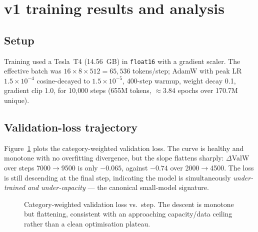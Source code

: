 \documentclass[10pt,twocolumn]{article}
\begin{document}
\section{v1 training results and analysis}
\label{sec:results}

\subsection{Setup}
Training used a Tesla~T4 (14.56~GB) in \texttt{float16} with a gradient scaler.
The effective batch was $16\times8\times512 = 65{,}536$ tokens/step; AdamW with
peak LR $1.5\!\times\!10^{-4}$ cosine-decayed to $1.5\!\times\!10^{-5}$,
400-step warmup, weight decay 0.1, gradient clip 1.0, for 10{,}000 steps
(655M tokens, $\approx$3.84 epochs over 170.7M unique).

\subsection{Validation-loss trajectory}
Figure~\ref{fig:loss} plots the category-weighted validation loss. The curve is
healthy and monotone with no overfitting divergence, but the slope flattens
sharply: $\Delta$ValW over steps 7000$\rightarrow$9500 is only $-0.065$, against
$-0.74$ over 2000$\rightarrow$4500. The loss is still descending at the final
step, indicating the model is simultaneously \emph{under-trained and
under-capacity} --- the canonical small-model signature.

\begin{figure}[t]
\centering
{}
\caption{Category-weighted validation loss vs.\ step. The descent is monotone
but flattening, consistent with an approaching capacity/data ceiling rather than
a clean optimisation plateau.}
\label{fig:loss}
\end{figure}
\end{document}

